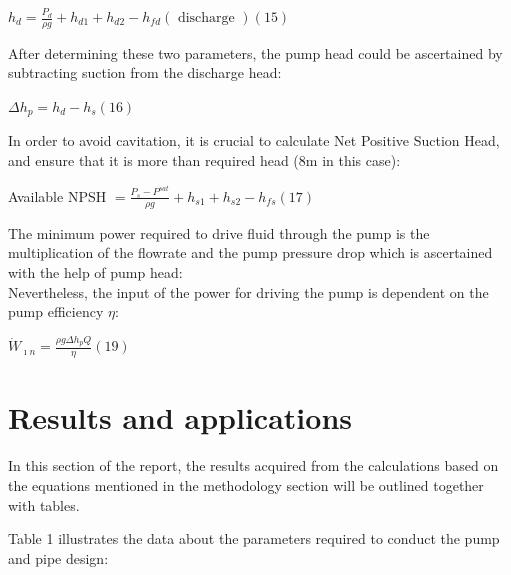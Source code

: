\documentclass[12pt]{article}
\begin{document}
{\begin{center}
\vspace{2mm}
$h_d=\frac{P_d}{\rho g}+h_{d 1}+h_{d 2}-h_{f d}(\text { discharge }) (15)$ \\

\end{center}

After determining these two parameters, the pump head could be ascertained by subtracting suction from the discharge head: 
\begin{center}
$\Delta h_p=h_d-h_s(16)$ \\
\end{center}

In order to avoid cavitation, it is crucial to calculate Net Positive Suction Head, and ensure that it is more than required head (8m in this case): 
\begin{center}
Available NPSH $=\frac{P_s-P^{s a t}}{\rho g}+h_{s 1}+h_{s 2}-h_{f s} (17)$ \\

\end{center}

The minimum power required to drive fluid through the pump is the multiplication of the flowrate and the pump pressure drop which is ascertained with the help of pump head: \\

Nevertheless, the input of the power for driving the pump is dependent on the pump efficiency $\eta$: \\

\begin{center}

$\dot{W}_{\imath n}=\frac{\rho g \Delta h_p Q}{\eta} (19)$
\end{center}

      }
      \section{Results and applications}
      {\fontsize{12pt}{12pt}
      \hspace*{1em} In this section of the report, the results acquired from the calculations based on the equations mentioned in the methodology section will be outlined together with tables. 

      Table 1 illustrates the data about the parameters required to conduct the pump and pipe design:
      }
\end{document}
